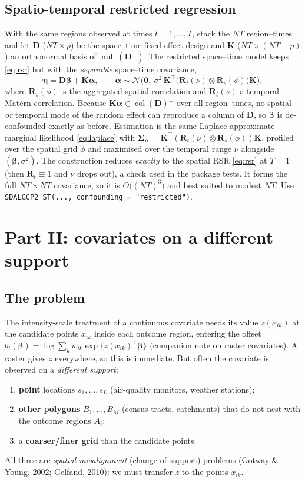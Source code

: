 \documentclass[11pt]{article}
\newcommand{\R}{\mathbf{R}}
\newcommand{\D}{\mathbf{D}}
\newcommand{\K}{\mathbf{K}}
\newcommand{\bet}{{\bm{\beta}}}
\newcommand{\al}{{\bm{\alpha}}}
\newcommand{\Sal}{{\bm{\Sigma}_{\bm{\alpha}}}}
\newcommand{\Ai}{A_i}
\newcommand{\N}{\mathcal{N}}
\begin{document}
\subsection{Spatio-temporal restricted regression}
With the same regions observed at times $t=1,\dots,T$, stack the $NT$ region--times
and let $\D$ ($NT\times p$) be the space--time fixed-effect design and $\K$
($NT\times(NT-p)$) an orthonormal basis of $\operatorname{null}(\D^\top)$. The
restricted space--time model keeps \eqref{eq:rsr} but with the \emph{separable}
space--time covariance,
\begin{equation}
\bm\eta=\D\bet+\K\al,\qquad
\al\sim\N\!\Big(\mathbf 0,\ \sigma^2\,\K^\top\big(\R_t(\nu)\otimes\R_s(\phi)\big)\K\Big),
\label{eq:rsr-st}
\end{equation}
where $\R_s(\phi)$ is the aggregated spatial correlation and $\R_t(\nu)$ a temporal
Mat\'ern correlation. Because $\K\al\in\operatorname{col}(\D)^\perp$ over all
region--times, no spatial \emph{or} temporal mode of the random effect can
reproduce a column of $\D$, so $\bet$ is de-confounded exactly as before.
Estimation is the same Laplace-approximate marginal likelihood \eqref{eq:laplace}
with $\Sal=\K^\top(\R_t(\nu)\otimes\R_s(\phi))\K$, profiled over the spatial grid
$\phi$ and maximised over the temporal range $\nu$ alongside $(\bet,\sigma^2)$. The
construction reduces \emph{exactly} to the spatial RSR \eqref{eq:rsr} at $T=1$ (then
$\R_t\equiv1$ and $\nu$ drops out), a check used in the package tests. It forms the
full $NT\times NT$ covariance, so it is $O\!\big((NT)^3\big)$ and best suited to
modest $NT$. Use \texttt{SDALGCP2\_ST(..., confounding = "restricted")}.

\section{Part II: covariates on a different support}

\subsection{The problem}
The intensity-scale treatment of a continuous covariate needs its value
$z(x_{ik})$ at the candidate points $x_{ik}$ inside each outcome region, entering
the offset
$b_i(\bet)=\log\sum_k w_{ik}\exp\{z(x_{ik})^\top\bet\}$
(companion note on raster covariates). A raster gives $z$ everywhere, so this is
immediate. But often the covariate is observed on a \emph{different support}:
\begin{enumerate}
\item \textbf{point} locations $s_1,\dots,s_L$ (air-quality monitors, weather
  stations);
\item \textbf{other polygons} $B_1,\dots,B_M$ (census tracts, catchments) that do
  not nest with the outcome regions $\Ai$;
\item a \textbf{coarser/finer grid} than the candidate points.
\end{enumerate}
All three are \emph{spatial misalignment} (change-of-support) problems
(Gotway \& Young, 2002; Gelfand, 2010): we must transfer $z$ to the points
$x_{ik}$.
\end{document}

